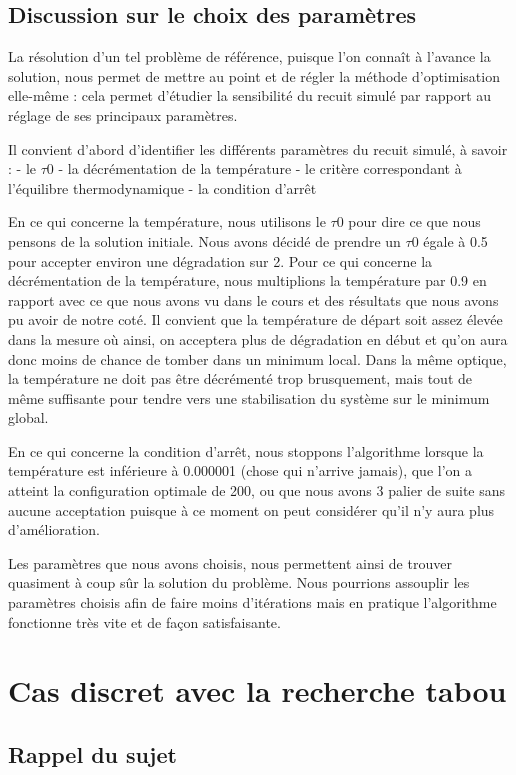 \documentclass{report}
\begin{document}
\section{Discussion sur le choix des paramètres}
La résolution d'un tel problème de référence, puisque l'on connaît à l'avance la solution, nous permet de mettre au point et de régler la méthode d'optimisation elle-même : cela permet d'étudier la sensibilité du recuit simulé par rapport au réglage de ses principaux paramètres.

Il convient d'abord d'identifier les différents paramètres du recuit simulé, à savoir :
- le $\tau 0$
- la décrémentation de la température
- le critère correspondant à l'équilibre thermodynamique
- la condition d'arrêt

En ce qui concerne la température, nous utilisons le $\tau 0$ pour dire ce que nous pensons de la solution initiale. Nous avons décidé de prendre un $\tau 0$ égale à 0.5 pour accepter environ une dégradation sur 2. Pour ce qui concerne la décrémentation de la température, nous multiplions la température par 0.9 en rapport avec ce que nous avons vu dans le cours et des résultats que nous avons pu avoir de notre coté. Il convient que la température de départ soit assez élevée dans la mesure où ainsi, on acceptera plus de dégradation en début et qu'on aura donc moins de chance de tomber dans un minimum local. Dans la même optique, la température ne doit pas être décrémenté trop brusquement, mais tout de même suffisante pour tendre vers une stabilisation du système sur le minimum global.

En ce qui concerne la condition d'arrêt, nous stoppons l'algorithme lorsque la température est inférieure à 0.000001 (chose qui n'arrive jamais), que l'on a atteint la configuration optimale de 200, ou que nous avons 3 palier de suite sans aucune acceptation puisque à ce moment on peut considérer qu'il n'y aura plus d'amélioration.

Les paramètres que nous avons choisis, nous permettent ainsi de trouver quasiment à coup sûr la solution du problème. Nous pourrions assouplir les paramètres choisis afin de faire moins d'itérations mais en pratique l'algorithme fonctionne très vite et de façon satisfaisante.

\newpage

\chapter{Cas discret avec la recherche tabou}
\minitoc
\section{Rappel du sujet}
\end{document}
